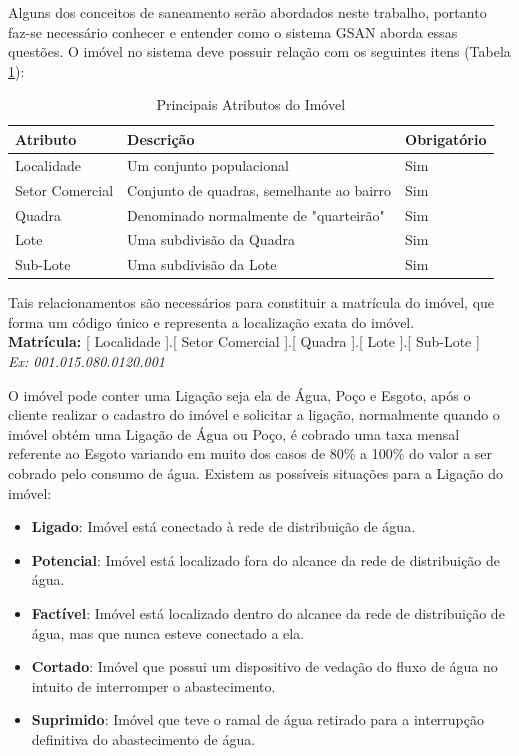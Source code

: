 Alguns dos conceitos de saneamento serão abordados neste trabalho, portanto faz-se necessário conhecer e entender como o sistema GSAN aborda essas questões.
O imóvel no sistema deve possuir relação com os seguintes itens (Tabela \ref{tabela:atributosImovel}):


\begin{table}[H]
	\center
	\footnotesize
	\caption{Principais Atributos do Imóvel}
	\label{tabela:atributosImovel}
	\begin{tabular}{|p{3cm}|p{7cm}|p{2.5cm}|} \hline
		\textbf{Atributo} 	& \textbf{Descrição}						& \textbf{Obrigatório}  \\ \hline
		Localidade 			& Um conjunto populacional					& Sim \\	\hline
		Setor Comercial 	& Conjunto de quadras, semelhante ao bairro & Sim \\ \hline
		Quadra 				& Denominado normalmente de "quarteirão" 	& Sim \\ \hline			
		Lote 				&  Uma subdivisão da Quadra 				& Sim \\ \hline
		Sub-Lote 			&  Uma subdivisão da Lote 					& Sim \\ \hline
	\end{tabular}
\end{table}


Tais relacionamentos são necessários para constituir a matrícula do imóvel, que forma um código único e representa a localização exata do imóvel.\\
\textbf{Matrícula:} [ Localidade ].[ Setor Comercial ].[ Quadra ].[ Lote ].[ Sub-Lote ]  \\
\textit{Ex: 001.015.080.0120.001}

O imóvel pode conter uma Ligação seja ela de Água, Poço e Esgoto, após o cliente realizar o cadastro do imóvel e solicitar a ligação, normalmente quando o imóvel obtém uma Ligação de Água ou Poço, é cobrado uma taxa mensal referente ao Esgoto variando em muito dos casos de 80\% a 100\% do valor a ser cobrado pelo consumo de água. Existem as possíveis situações para a Ligação do imóvel:

\begin{itemize}
	\item \textbf{Ligado}: Imóvel está conectado à rede de distribuição de água.
	\item \textbf{Potencial}: Imóvel está localizado fora do alcance da rede de distribuição de água.
	\item \textbf{Factível}: Imóvel está localizado dentro do alcance da rede de distribuição de água, mas que nunca esteve conectado a ela.
	\item \textbf{Cortado}: Imóvel que possui um dispositivo de vedação do fluxo de água no intuito de interromper o abastecimento.
	\item \textbf{Suprimido}: Imóvel que teve o ramal de água retirado para a interrupção definitiva do abastecimento de água.	
\end{itemize}

